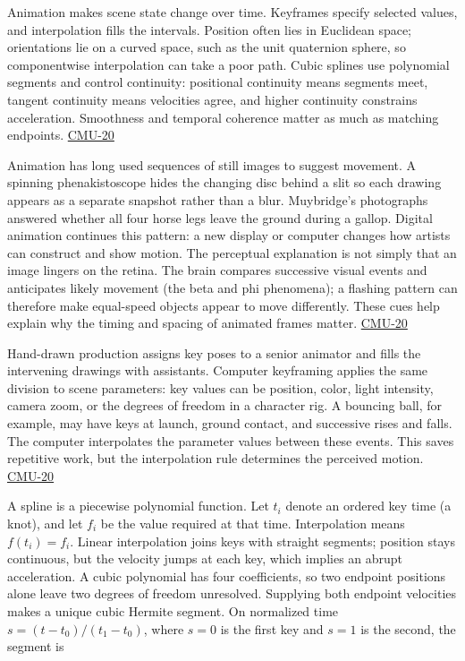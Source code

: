 Animation makes scene state change over time. Keyframes specify selected values, and interpolation fills the intervals. Position often lies in Euclidean space; orientations lie on a curved space, such as the unit quaternion sphere, so componentwise interpolation can take a poor path. Cubic splines use polynomial segments and control continuity: positional continuity means segments meet, tangent continuity means velocities agree, and higher continuity constrains acceleration. Smoothness and temporal coherence matter as much as matching endpoints. \hyperref[04-visual-computing-ii-ch036]{CMU-20}

Animation has long used sequences of still images to suggest movement. A spinning phenakistoscope hides the changing disc behind a slit so each drawing appears as a separate snapshot rather than a blur. Muybridge's photographs answered whether all four horse legs leave the ground during a gallop. Digital animation continues this pattern: a new display or computer changes how artists can construct and show motion. The perceptual explanation is not simply that an image lingers on the retina. The brain compares successive visual events and anticipates likely movement (the beta and phi phenomena); a flashing pattern can therefore make equal-speed objects appear to move differently. These cues help explain why the timing and spacing of animated frames matter. \hyperref[04-visual-computing-ii-ch036]{CMU-20}

Hand-drawn production assigns key poses to a senior animator and fills the intervening drawings with assistants. Computer keyframing applies the same division to scene parameters: key values can be position, color, light intensity, camera zoom, or the degrees of freedom in a character rig. A bouncing ball, for example, may have keys at launch, ground contact, and successive rises and falls. The computer interpolates the parameter values between these events. This saves repetitive work, but the interpolation rule determines the perceived motion. \hyperref[04-visual-computing-ii-ch036]{CMU-20}

A spline is a piecewise polynomial function. Let \(t_i\) denote an ordered key time (a knot), and let \(f_i\) be the value required at that time. Interpolation means \(f(t_i)=f_i\). Linear interpolation joins keys with straight segments; position stays continuous, but the velocity jumps at each key, which implies an abrupt acceleration. A cubic polynomial has four coefficients, so two endpoint positions alone leave two degrees of freedom unresolved. Supplying both endpoint velocities makes a unique cubic Hermite segment. On normalized time \(s=(t-t_0)/(t_1-t_0)\), where \(s=0\) is the first key and \(s=1\) is the second, the segment is

